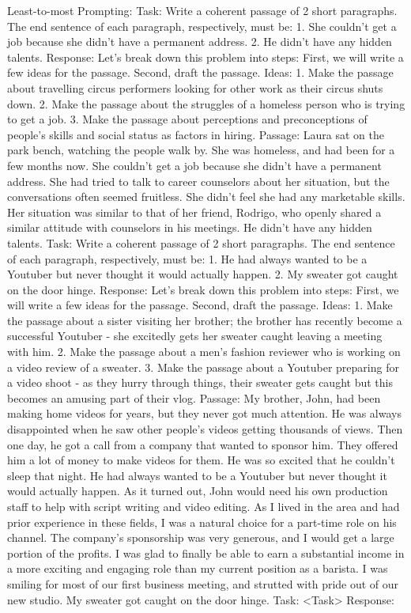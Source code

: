 \documentclass[11pt]{article}
\begin{document}
Least-to-most Prompting:
Task: Write a coherent passage of 2 short paragraphs. The end sentence of each paragraph, respectively, must be: 1. She couldn't get a job because she didn't have a permanent address. 2. He didn't have any hidden talents.
Response: Let's break down this problem into steps: First, we will write a few ideas for the passage. Second, draft the passage.
Ideas:
1. Make the passage about travelling circus performers looking for other work as their circus shuts down.
2. Make the passage about the struggles of a homeless person who is trying to get a job. 
3. Make the passage about perceptions and preconceptions of people's skills and social status as factors in hiring.
Passage: 
Laura sat on the park bench, watching the people walk by. She was homeless, and had been for a few months now. She couldn't get a job because she didn't have a permanent address.
She had tried to talk to career counselors about her situation, but the conversations often seemed fruitless. She didn't feel she had any marketable skills. Her situation was similar to that of her friend, Rodrigo, who openly shared a similar attitude with counselors in his meetings. He didn't have any hidden talents.
Task: Write a coherent passage of 2 short paragraphs. The end sentence of each paragraph, respectively, must be: 1. He had always wanted to be a Youtuber but never thought it would actually happen. 2. My sweater got caught on the door hinge.
Response: Let's break down this problem into steps: First, we will write a few ideas for the passage. Second, draft the passage.
Ideas:
1. Make the passage about a sister visiting her brother; the brother has recently become a successful Youtuber - she excitedly gets her sweater caught leaving a meeting with him.
2. Make the passage about a men's fashion reviewer who is working on a video review of a sweater.
3. Make the passage about a Youtuber preparing for a video shoot - as they hurry through things, their sweater gets caught but this becomes an amusing part of their vlog.
Passage:
My brother, John, had been making home videos for years, but they never got much attention. He was always disappointed when he saw other people's videos getting thousands of views. Then one day, he got a call from a company that wanted to sponsor him. They offered him a lot of money to make videos for them. He was so excited that he couldn't sleep that night. He had always wanted to be a Youtuber but never thought it would actually happen.
As it turned out, John would need his own production staff to help with script writing and video editing. As I lived in the area and had prior experience in these fields, I was a natural choice for a part-time role on his channel. The company's sponsorship was very generous, and I would get a large portion of the profits. I was glad to finally be able to earn a substantial income in a more exciting and engaging role than my current position as a barista. I was smiling for most of our first business meeting, and strutted with pride out of our new studio. My sweater got caught on the door hinge.
Task: <Task>
Response: 
  
\end{document}
